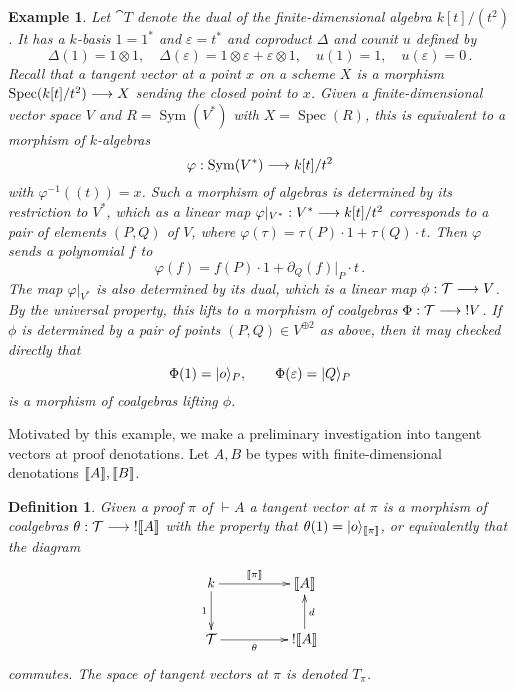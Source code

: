 \documentclass[english,letter paper,12pt,reqno]{article}
\DeclarePairedDelimiter\ket{\lvert}{\rangle}
\theoremstyle{example}
\newtheorem{definition}[theorem]{Definition}
\newtheorem{example}[theorem]{Example}
\numberwithin{equation}{section}
\DeclareMathOperator{\Spec}{Spec}
\DeclareMathOperator{\Sym}{Sym}
\begin{document}

\begin{example}\label{example:tangent_coalgebra} Let $\cat{T}$ denote the dual of the finite-dimensional algebra $k[t]/(t^2)$. It has a $k$-basis $1 = 1^*$ and $\varepsilon = t^*$ and coproduct $\Delta$ and counit $u$ defined by
\[
\Delta(1) = 1 \otimes 1, \quad \Delta( \varepsilon ) = 1 \otimes \varepsilon + \varepsilon \otimes 1, \quad u(1) = 1, \quad u(\varepsilon) = 0\,.
\]
Recall that a tangent vector at a point $x$ on a scheme $X$ is a morphism $\Spec(k[t]/t^2) \lto X$ sending the closed point to $x$. Given a finite-dimensional vector space $V$ and $R = \Sym(V^*)$ with $X = \Spec(R)$, this is equivalent to a morphism of $k$-algebras
\[
\varphi: \Sym(V^*) \lto k[t]/t^2
\]
with $\varphi^{-1}( (t) ) = x$. Such a morphism of algebras is determined by its restriction to $V^*$, which as a linear map $\varphi|_{V^*}: V^* \longrightarrow k[t]/t^2$ corresponds to a pair of elements $(P, Q)$ of $V$, where $\varphi( \tau ) = \tau(P) \cdot 1 + \tau(Q) \cdot t$. Then $\varphi$ sends a polynomial $f$ to
\[
\varphi(f) = f(P) \cdot 1 + \partial_Q( f )|_P \cdot t\,.
\]
The map $\varphi|_{V^*}$ is also determined by its dual, which is a linear map $\phi: \mathcal{T} \longrightarrow V$. By the universal property, this lifts to a morphism of coalgebras $\Phi: \mathcal{T} \longrightarrow {!}V$. If $\phi$ is determined by a pair of points $(P,Q) \in V^{\oplus 2}$ as above, then it may checked directly that
\[
\Phi( 1 ) = \ket{o}_P, \qquad \Phi( \varepsilon ) = \ket{ Q }_P
\]
is a morphism of coalgebras lifting $\phi$.
\end{example}

Motivated by this example, we make a preliminary investigation into tangent vectors at proof denotations. Let $A,B$ be types with finite-dimensional denotations $\llbracket A \rrbracket, \llbracket B \rrbracket$.

\begin{definition} Given a proof $\pi$ of $\vdash A$ a \emph{tangent vector} at $\pi$ is a morphism of coalgebras $\theta: \mathcal{T} \longrightarrow {!} \llbracket A \rrbracket$ with the property that $\theta(1) = \ket{o}_{\den{\pi}}$, or equivalently that the diagram
\begin{equation}
\xymatrix@C+2pc{
k \ar[d]_-{1} \ar[r]^-{\den{\pi}} & \den{A}\\
\cat{T} \ar[r]_-{\theta} & {!} \den{A} \ar[u]_-{d}
}
\end{equation}
commutes. The space of tangent vectors at $\pi$ is denoted $T_{\pi}$.
\end{definition}
\end{document}
